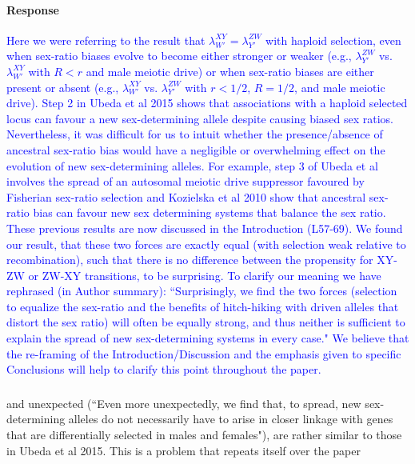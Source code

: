 \documentclass[10pt,letterpaper]{article}
\begin{document}
\noindent\paragraph{Response}
\textcolor{blue}{
Here we were referring to the result that $\lambda_{W'}^{XY} = \lambda_{Y'}^{ZW}$ with haploid selection, even when sex-ratio biases evolve to become either stronger or weaker (e.g., $\lambda_{Y'}^{ZW}$ vs. $\lambda_{W'}^{XY}$ with $R<r$ and male meiotic drive) or when sex-ratio biases are either present or absent (e.g., $\lambda_{W'}^{XY}$ vs. $\lambda_{Y'}^{ZW}$ with $r<1/2$, $R=1/2$, and male meiotic drive).  
Step 2 in Ubeda et al 2015 shows that associations with a haploid selected locus can favour a new sex-determining allele despite causing biased sex ratios. 
Nevertheless, it was difficult for us to intuit whether the presence/absence of ancestral sex-ratio bias would have a negligible or overwhelming effect on the evolution of new sex-determining alleles. 
For example, step 3 of Ubeda et al involves the spread of an autosomal meiotic drive suppressor favoured by Fisherian sex-ratio selection and Kozielska et al 2010 show that ancestral sex-ratio bias can favour new sex determining systems that balance the sex ratio.
These previous results are now discussed in the Introduction (L57-69). 
We found our result, that these two forces are exactly equal (with selection weak relative to recombination), such that there is no difference between the propensity for XY-ZW or ZW-XY transitions, to be surprising.
To clarify our meaning we have rephrased (in Author summary): ``Surprisingly, we find the two forces (selection to equalize the sex-ratio and the benefits of hitch-hiking with driven alleles that distort the sex ratio) will often be equally strong, and thus neither is sufficient to explain the spread of new sex-determining systems in every case." 
We believe that the re-framing of the Introduction/Discussion and the emphasis given to specific Conclusions will help to clarify this point throughout the paper.
}

\noindent\subsubsection{}
\noindent and unexpected (``Even more unexpectedly, we find that, to spread, new sex-determining alleles do not necessarily have to arise in closer linkage with genes that are differentially selected in males and females"), are rather similar to those in Ubeda et al 2015. This is a problem that repeats itself over the paper 
\end{document}
